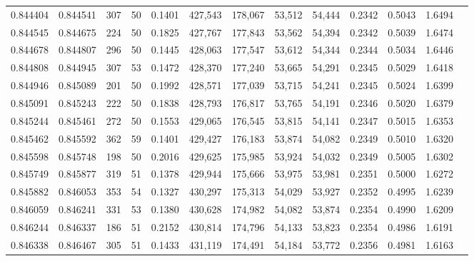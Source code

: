 \begin{tabular}{rrrrrrrrrrrrr}
0.844404 & 0.844541 &   307 &  50 &                                     0.1401 & 427,543 & 178,067 &  53,512 &  54,444 & 0.2342 & 0.5043 & 1.6494 \\
0.844545 & 0.844675 &   224 &  50 &                                     0.1825 & 427,767 & 177,843 &  53,562 &  54,394 & 0.2342 & 0.5039 & 1.6474 \\
0.844678 & 0.844807 &   296 &  50 &                                     0.1445 & 428,063 & 177,547 &  53,612 &  54,344 & 0.2344 & 0.5034 & 1.6446 \\
0.844808 & 0.844945 &   307 &  53 &                                     0.1472 & 428,370 & 177,240 &  53,665 &  54,291 & 0.2345 & 0.5029 & 1.6418 \\
0.844946 & 0.845089 &   201 &  50 &                                     0.1992 & 428,571 & 177,039 &  53,715 &  54,241 & 0.2345 & 0.5024 & 1.6399 \\
0.845091 & 0.845243 &   222 &  50 &                                     0.1838 & 428,793 & 176,817 &  53,765 &  54,191 & 0.2346 & 0.5020 & 1.6379 \\
0.845244 & 0.845461 &   272 &  50 &                                     0.1553 & 429,065 & 176,545 &  53,815 &  54,141 & 0.2347 & 0.5015 & 1.6353 \\
0.845462 & 0.845592 &   362 &  59 &                                     0.1401 & 429,427 & 176,183 &  53,874 &  54,082 & 0.2349 & 0.5010 & 1.6320 \\
0.845598 & 0.845748 &   198 &  50 &                                     0.2016 & 429,625 & 175,985 &  53,924 &  54,032 & 0.2349 & 0.5005 & 1.6302 \\
0.845749 & 0.845877 &   319 &  51 &                                     0.1378 & 429,944 & 175,666 &  53,975 &  53,981 & 0.2351 & 0.5000 & 1.6272 \\
0.845882 & 0.846053 &   353 &  54 &                                     0.1327 & 430,297 & 175,313 &  54,029 &  53,927 & 0.2352 & 0.4995 & 1.6239 \\
0.846059 & 0.846241 &   331 &  53 &                                     0.1380 & 430,628 & 174,982 &  54,082 &  53,874 & 0.2354 & 0.4990 & 1.6209 \\
0.846244 & 0.846337 &   186 &  51 &                                     0.2152 & 430,814 & 174,796 &  54,133 &  53,823 & 0.2354 & 0.4986 & 1.6191 \\
0.846338 & 0.846467 &   305 &  51 &                                     0.1433 & 431,119 & 174,491 &  54,184 &  53,772 & 0.2356 & 0.4981 & 1.6163 \\

\end{tabular}
